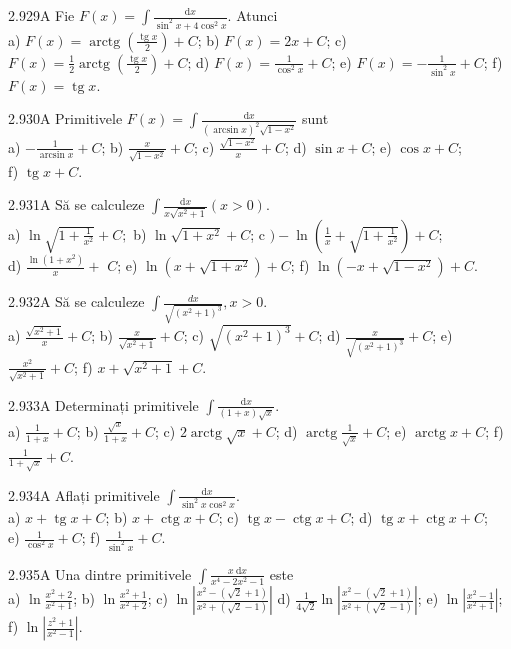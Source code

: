 \documentclass[11pt]{article}
\begin{document}
2.929A Fie $F(x)=\int \frac{\mathrm{d} x}{\sin ^{2} x+4 \cos ^{2} x}$. Atunci\\ a) $F(x)=\operatorname{arctg}\left(\frac{\operatorname{tg} x}{2}\right)+C$; b) $F(x)=2 x+C$; c) $F(x)=\frac{1}{2} \operatorname{arctg}\left(\frac{\operatorname{tg} x}{2}\right)+C$; d) $F(x)=\frac{1}{\cos ^{2} x}+C$; e) $F(x)=-\frac{1}{\sin ^{2} x}+C$; f) $F(x)=\operatorname{tg} x$.

2.930A Primitivele $F(x)=\int \frac{\mathrm{d} x}{(\arcsin x)^{2} \sqrt{1-x^{2}}}$ sunt\\ a) $-\frac{1}{\arcsin x}+C$; b) $\frac{x}{\sqrt{1-x^{2}}}+C$; c) $\frac{\sqrt{1-x^{2}}}{x}+C$; d) $\sin x+C$; e) $\cos x+C$;\\ f) $\operatorname{tg} x+C$.

2.931A Să se calculeze $\int \frac{\mathrm{d} x}{x \sqrt{x^{2}+1}}(x>0)$.\\ a) $\ln \sqrt{1+\frac{1}{x^{2}}}+C ;$ b) $\ln \sqrt{1+x^{2}}+C$; c $)-\ln \left(\frac{1}{x}+\sqrt{1+\frac{1}{x^{2}}}\right)+C$;\\ d) $\frac{\ln \left(1+x^{2}\right)}{x}+$ $C$; e) $\ln \left(x+\sqrt{1+x^{2}}\right)+C$; f) $\ln \left(-x+\sqrt{1-x^{2}}\right)+C$.

2.932A Să se calculeze $\int \frac{d x}{\sqrt{\left(x^{2}+1\right)^{3}}}, x>0$.\\ a) $\frac{\sqrt{x^{2}+1}}{x}+C$; b) $\frac{x}{\sqrt{x^{2}+1}}+C$; c) $\sqrt{\left(x^{2}+1\right)^{3}}+C$; d) $\frac{x}{\sqrt{\left(x^{2}+1\right)^{3}}}+C$; e) $\frac{x^{2}}{\sqrt{x^{2}+1}}+C$; f) $x+\sqrt{x^{2}+1}+C$.

2.933A Determinați primitivele $\int \frac{\mathrm{d} x}{(1+x) \sqrt{x}}$.\\ a) $\frac{1}{1+x}+C$; b) $\frac{\sqrt{x}}{1+x}+C$; c) $2 \operatorname{arctg} \sqrt{x}+C$; d) $\operatorname{arctg} \frac{1}{\sqrt{x}}+C$; e) $\operatorname{arctg} x+C$; f) $\frac{1}{1+\sqrt{x}}+C$.

2.934A Aflați primitivele $\int \frac{\mathrm{d} x}{\sin ^{2} x \cos ^{2} x}$.\\ a) $x+\operatorname{tg} x+C$; b) $x+\operatorname{ctg} x+C$; c) $\operatorname{tg} x-\operatorname{ctg} x+C$; d) $\operatorname{tg} x+\operatorname{ctg} x+C$;\\ e) $\frac{1}{\cos ^{2} x}+C$; f) $\frac{1}{\sin ^{2} x}+C$.

2.935A Una dintre primitivele $\int \frac{x \mathrm{~d} x}{x^{4}-2 x^{2}-1}$ este\\ a) $\ln \frac{x^{2}+2}{x^{2}+1}$; b) $\ln \frac{x^{2}+1}{x^{2}+2}$; c) $\ln \left|\frac{x^{2}-(\sqrt{2}+1)}{x^{2}+(\sqrt{2}-1)}\right|$ d) $\frac{1}{4 \sqrt{2}} \ln \left|\frac{x^{2}-(\sqrt{2}+1)}{x^{2}+(\sqrt{2}-1)}\right|$; e) $\ln \left|\frac{x^{2}-1}{x^{2}+1}\right|$;\\ f) $\ln \left|\frac{z^{2}+1}{x^{2}-1}\right|$.
\end{document}

